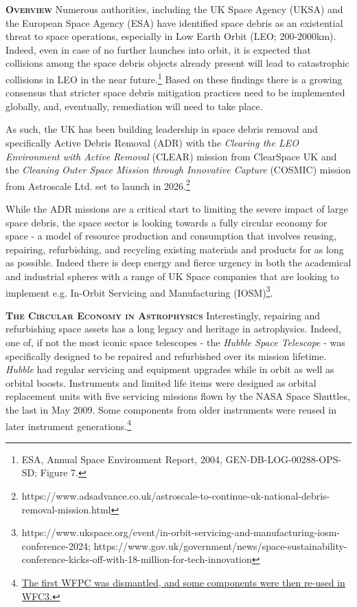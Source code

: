 \documentclass[a4paper,12pt]{article}
\begin{document}
\pagebreak
\smallskip
\smallskip
\noindent
{\bfseries \textsc{\textcolor{Cerulean}{Overview}}} Numerous
authorities, including the UK Space Agency (UKSA) and the European
Space Agency (ESA) have identified space debris as an existential
threat to space operations, especially in Low Earth Orbit (LEO;
200-2000km).  Indeed, even in case of no further launches into orbit,
it is expected that collisions among the space debris objects already
present will lead to catastrophic collisions in LEO in the near
future.\footnote{ESA, Annual Space Environment Report, 2004,
GEN-DB-LOG-00288-OPS-SD; Figure 7.}  Based on these findings there is
a growing consensus that stricter space debris mitigation practices
need to be implemented globally, and, eventually, remediation will need to 
take place. 

\smallskip
\smallskip
\noindent
As such, the UK has been building leadership in space debris removal
and specifically Active Debris Removal (ADR) with the \textit{Clearing
the LEO Environment with Active Removal} (CLEAR) mission from
ClearSpace UK and the \textit{Cleaning Outer Space Mission through
Innovative Capture} (COSMIC) mission from Astroscale Ltd. set to
launch in 2026.\footnote{https://www.adsadvance.co.uk/astroscale-to-continue-uk-national-debris-removal-mission.html}

\smallskip
\smallskip
\noindent
While the ADR missions are a critical start to limiting the severe
impact of large space debris, the space sector is looking towards a
fully circular economy for space - a model of resource production and
consumption that involves reusing, repairing, refurbishing, and
recycling existing materials and products for as long as possible.
Indeed there is deep energy and fierce urgency in both the academical and industrial
spheres with a range of UK Space companies that are looking to
implement e.g. In-Orbit Servicing and Manufacturing
(IOSM)\footnote{https://www.ukspace.org/event/in-orbit-servicing-and-manufacturing-iosm-conference-2024; https://www.gov.uk/government/news/space-sustainability-conference-kicks-off-with-18-million-for-tech-innovation}.

\smallskip
\smallskip
\noindent
{\bfseries \textsc{\textcolor{Cerulean}{The Circular Economy in Astrophysics}}}
Interestingly, repairing and refurbishing space assets has a long
legacy and heritage in astrophysics.  Indeed, one of, if not the most
iconic space telescopes - the \textit{Hubble Space Telescope} - was
specifically designed to be repaired and refurbished over its mission
lifetime.  \textit{Hubble} had regular servicing and equipment upgrades while in orbit as well as orbital boosts.  Instruments and limited life items were designed as orbital replacement units with
five servicing missions flown by the NASA Space Shuttles, the last in May
2009. Some components from older instruments were reused in later instrument generations.\footnote{\href{https://en.wikipedia.org/wiki/Hubble\_Space\_Telescope\#List\_of\_Hubble\_instruments}{The first WFPC was dismantled, and some components were then re-used in WFC3.}
}
\end{document}
